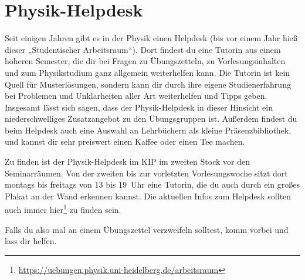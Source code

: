 \section{Physik-Helpdesk}
\label{sec:physik-helpdesk}

Seit einigen Jahren gibt es in der Physik einen Helpdesk (bis vor einem Jahr hieß dieser „Studentischer Arbeitsraum“). Dort findest du eine Tutorin aus einem höheren Semester, die dir bei Fragen zu Übungszetteln, zu Vorlesungsinhalten und zum Physikstudium ganz allgemein weiterhelfen kann. Die Tutorin ist kein Quell für Musterlösungen, sondern kann dir durch ihre eigene Studienerfahrung bei Problemen und Unklarheiten aller Art weiterhelfen und Tipps geben. Insgesamt lässt sich sagen, dass der Physik-Helpdesk in dieser Hinsicht ein niederschwelliges Zusatzangebot zu den Übungsgruppen ist. Außerdem findest du beim Helpdesk auch eine Auswahl an Lehrbüchern als kleine Präsenzbibliothek, und kannst dir sehr preiswert einen Kaffee oder einen Tee machen.

Zu finden ist der Physik-Helpdesk im \gls{KIP} im zweiten Stock vor den Seminarräumen. Von der zweiten bis zur vorletzten Vorlesungswoche sitzt dort montags bis freitags von 13 bis 19~Uhr eine Tutorin, die du auch durch ein großes Plakat an der Wand erkennen kannst. Die aktuellen Infos zum Helpdesk sollten auch immer hier\footnote{\url{https://uebungen.physik.uni-heidelberg.de/arbeitsraum}} zu finden sein.

Falls du also mal an einem Übungszettel verzweifeln solltest, komm vorbei und lass dir helfen.
